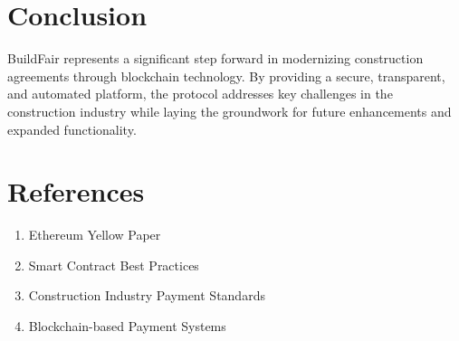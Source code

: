 \documentclass[12pt]{article}
\begin{document}
\section{Conclusion}
BuildFair represents a significant step forward in modernizing construction agreements through blockchain technology. By providing a secure, transparent, and automated platform, the protocol addresses key challenges in the construction industry while laying the groundwork for future enhancements and expanded functionality.

\section{References}
\begin{enumerate}
    \item Ethereum Yellow Paper
    \item Smart Contract Best Practices
    \item Construction Industry Payment Standards
    \item Blockchain-based Payment Systems
\end{enumerate}
\end{document}

